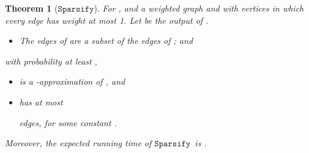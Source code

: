 \documentclass[11pt]{article}
\newtheorem{theorem}{Theorem}[section]
\newcommand{\sparsify}{\ensuremath{\mathtt{Sparsify}}}
\begin{document}
\begin{theorem}[\sparsify]\label{thm:sparsify}
For ,  and a weighted graph 
  and with  vertices in which every edge has weight at most 1.
Let  be the output of .
\begin{itemize}
\item [(X.1)] The edges of  are a subset of the edges of ; and
\end{itemize}
with probability at least ,
\begin{itemize}
\item [(X.2)]  is a -approximation of , and
\item [(X.3)]  has at most
  
  edges, for some constant .
\end{itemize}
Moreover, the expected running time of \sparsify  \ is 
  .
\end{theorem}
\end{document}
